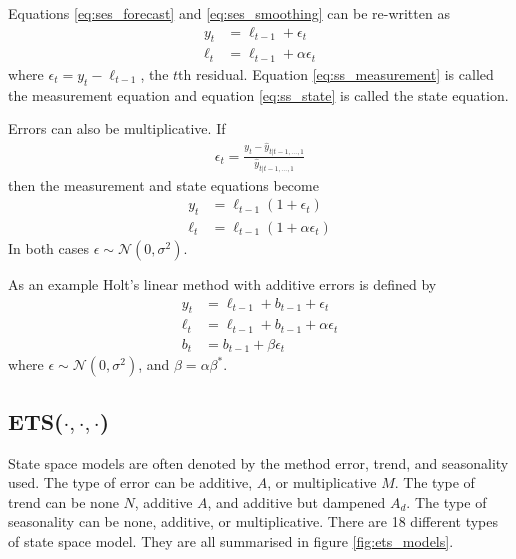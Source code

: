 \documentclass[a4paper,12pt]{article}
\theoremstyle{definition}
\begin{document}
Equations \ref{eq:ses_forecast} and \ref{eq:ses_smoothing} can be re-written as
\begin{align}
	y_t &= \ell_{t-1} + \epsilon_t \label{eq:ss_measurement} \\
	\ell_t &= \ell_{t-1} + \alpha \epsilon_t \label{eq:ss_state}
\end{align}
where $\epsilon_t = y_t - \ell_{t-1}$, the $t$th residual. Equation \ref{eq:ss_measurement} is called the measurement equation and equation \ref{eq:ss_state} is called the state equation. 

Errors can also be multiplicative. If 
\begin{align}
	\epsilon_t = \frac{y_t - \hat{y}_{t|t-1,\dots,1}}{\hat{y}_{t|t-1,\dots,1}}
\end{align}
then the measurement and state equations become
\begin{align}
	y_t &= \ell_{t-1}(1 + \epsilon_t) \\
	\ell_t &= \ell_{t-1}(1 + \alpha \epsilon_t)
\end{align}
In both cases $\epsilon \sim \mathcal{N}(0, \sigma^2)$.

As an example Holt's linear method with additive errors is defined by 
\begin{align}
	y_t &= \ell_{t-1} + b_{t-1} + \epsilon_t \\
	\ell_t &= \ell_{t-1} + b_{t-1} + \alpha \epsilon_{t} \\
	b_t &= b_{t-1} + \beta \epsilon_t 
\end{align}
where $\epsilon \sim \mathcal{N}(0,\sigma^2)$, and $\beta = \alpha\beta^*$.

\subsection{ETS($\cdot,\cdot,\cdot$)}
State space models are often denoted by the method error, trend, and seasonality used. The type of error can be additive, $A$, or multiplicative $M$. The type of trend can be none $N$, additive $A$, and additive but dampened $A_d$. The type of seasonality can be none, additive, or multiplicative. There are 18 different types of state space model. They are all summarised in figure \ref{fig:ets_models}.
\end{document}
